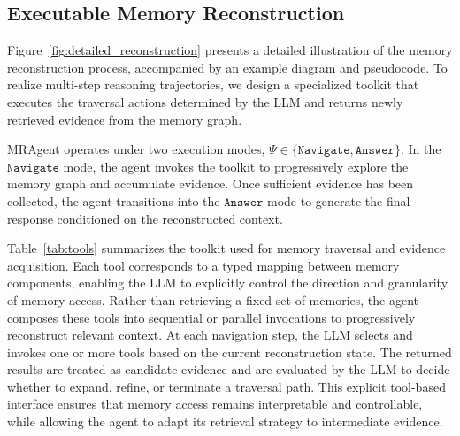 \documentclass{llmxive}
\begin{document}
\subsection{Executable Memory Reconstruction}
\label{app:reconstruction}
Figure~\ref{fig:detailed_reconstruction} presents a detailed illustration of the memory reconstruction process, accompanied by an example diagram and pseudocode.
To realize multi-step reasoning trajectories, we design a specialized toolkit that executes the traversal actions determined by the LLM and returns newly retrieved evidence from the memory graph.

MRAgent operates under two execution modes, $\Psi \in \{\mathtt{Navigate}, \mathtt{Answer}\}$.
In the $\mathtt{Navigate}$ mode, the agent invokes the toolkit to progressively explore the memory graph and accumulate evidence.
Once sufficient evidence has been collected, the agent transitions into the $\mathtt{Answer}$ mode to generate the final response conditioned on the reconstructed context.

Table~\ref{tab:tools} summarizes the toolkit used for memory traversal and evidence acquisition.
Each tool corresponds to a typed mapping between memory components, enabling the LLM to explicitly control the direction and granularity of memory access.
Rather than retrieving a fixed set of memories, the agent composes these tools into sequential or parallel invocations to progressively reconstruct relevant context.
At each navigation step, the LLM selects and invokes one or more tools based on the current reconstruction state.
The returned results are treated as candidate evidence and are evaluated by the LLM to decide whether to expand, refine, or terminate a traversal path.
This explicit tool-based interface ensures that memory access remains interpretable and controllable, while allowing the agent to adapt its retrieval strategy to intermediate evidence.
\end{document}
